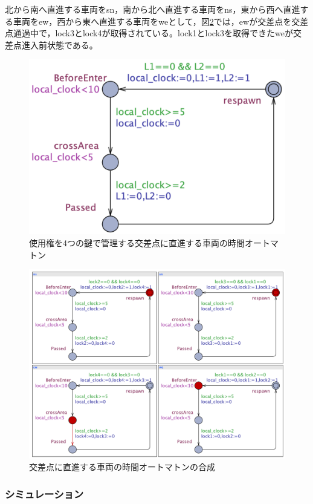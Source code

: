 \documentclass{tpu-sotu}
\begin{document}
	北から南へ直進する車両をsn，南から北へ直進する車両をns，東から西へ直進する車両をew，西から東へ直進する車両をweとして，図\ref{newsS}では，ewが交差点を交差点通過中で，lock3とlock4が取得されている。lock1とlock3を取得できたweが交差点進入前状態である。
	\begin{figure}[htbp]
	\centering
	\includegraphics[width=130mm]{news.png}
	\caption{使用権を4つの鍵で管理する交差点に直進する車両の時間オートマトン}
	\label{news}
	\end{figure}
	\begin{figure}[htbp]
	\centering
	\includegraphics[width=130mm]{newsSimu.png}
	\caption{交差点に直進する車両の時間オートマトンの合成}
	\label{newsS}
	\end{figure}
	\subsubsection{シミュレーション}
	
\end{document}
